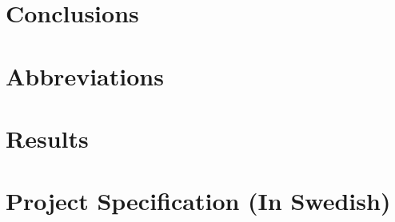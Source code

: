 \documentclass[12pt,twoside]{kau_report}
\begin{document}
\section{Conclusions}
\label{sec:conclusion}

\cleardoublepage


\begin{singlespace}


\end{singlespace}
\cleardoublepage

\appendix
\section{Abbreviations}
\label{sec:abbreviations}

\cleardoublepage

\section{Results}
\label{app:results}



\cleardoublepage

%


%

\section{Project Specification (In Swedish)}
\label{app:projectspec}
%
%
\end{document}
